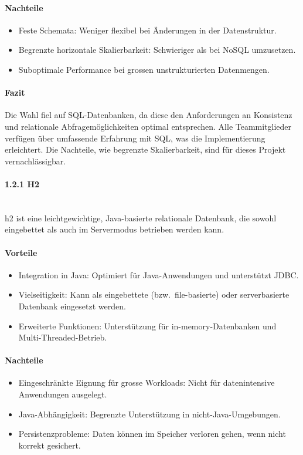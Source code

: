 \documentclass[a4paper,12pt]{report}
\begin{document}
    \paragraph*{Nachteile}
    \begin{itemize}
        \item Feste Schemata: Weniger flexibel bei Änderungen in der Datenstruktur.
        \item Begrenzte horizontale Skalierbarkeit: Schwieriger als bei NoSQL umzusetzen.
        \item Suboptimale Performance bei grossen unstrukturierten Datenmengen.
    \end{itemize}

    \paragraph*{Fazit}
    Die Wahl fiel auf SQL-Datenbanken, da diese den Anforderungen an Konsistenz und relationale Abfragemöglichkeiten optimal entsprechen.
    Alle Teammitglieder verfügen über umfassende Erfahrung mit SQL, was die Implementierung erleichtert.
    Die Nachteile, wie begrenzte Skalierbarkeit, sind für dieses Projekt vernachlässigbar.

    \paragraph*{1.2.1 H2}\mbox{}\\
    \gls{h2} ist eine leichtgewichtige, Java-basierte relationale Datenbank, die sowohl eingebettet als auch im Servermodus betrieben werden kann.

    \paragraph*{Vorteile}
    \begin{itemize}
        \item Integration in Java: Optimiert für Java-Anwendungen und unterstützt JDBC\@.
        \item Vielseitigkeit: Kann als eingebettete (bzw.\ file-basierte) oder serverbasierte Datenbank eingesetzt werden.
        \item Erweiterte Funktionen: Unterstützung für in-memory-Datenbanken und Multi-Threaded-Betrieb.
    \end{itemize}

    \paragraph*{Nachteile}
    \begin{itemize}
        \item Eingeschränkte Eignung für grosse Workloads: Nicht für datenintensive Anwendungen ausgelegt.
        \item Java-Abhängigkeit: Begrenzte Unterstützung in nicht-Java-Umgebungen.
        \item Persistenzprobleme: Daten können im Speicher verloren gehen, wenn nicht korrekt gesichert.
    \end{itemize}
\end{document}
